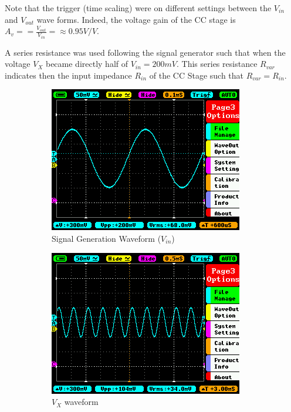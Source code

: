 \documentclass[12pt]{article}
\begin{document}
Note that the trigger (time scaling) were on different settings between the $V_{in}$ and $V_{out}$ wave forms. Indeed, the voltage gain of the CC stage is $A_v = = \frac{V_{out}}{V_{in}} =\approx 0.95V/V$.


A series resistance was used following the signal generator such that when the voltage $V_X$ became directly half of $V_{in} = 200mV$. This series resistance $R_{var}$ indicates then the input impedance $R_{in}$ of the CC Stage such that $R_{var} = R_{in}$.
\begin{figure}[H]
\centering
    \begin{subfigure}{.45\textwidth}
      \centering
      \includegraphics[width=\linewidth]{Lab2/SignalGenerator_Vin.png}  
      \caption{Signal Generation Waveform ($V_{in}$)}
    \end{subfigure}
    \begin{subfigure}{.45\textwidth}
      \centering
      \includegraphics[width=\linewidth]{Lab2/V_X.png}  
      \caption{$V_X$ waveform}
    \end{subfigure}
    \caption{}
\end{figure}
\end{document}
